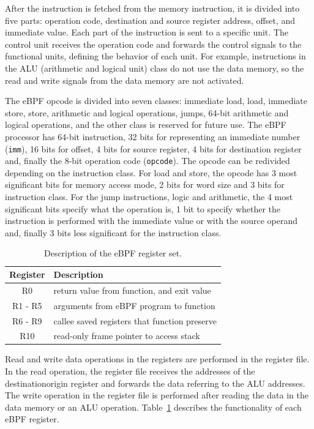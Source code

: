 After the instruction is fetched from the memory instruction, it is divided into five parts: operation code, destination and source register address, offset, and immediate value. Each part of the instruction is sent to a specific unit. The control unit receives the operation code and forwards the control signals to the functional units, defining the behavior of each unit. For example, instructions in the ALU (arithmetic and logical unit) class do not use the data memory, so the read and write signals from the data memory are not activated.

The eBPF opcode is divided into seven classes: immediate load, load, immediate store, store, arithmetic and logical operations, jumps, 64-bit arithmetic and logical operations, and the other class is reserved for future use. The eBPF processor has 64-bit instruction, 32 bits for representing an immediate number (\texttt{imm}), 16 bits for offset, 4 bits for source register, 4 bits for destination register and, finally the 8-bit operation code (\texttt{opcode}). The opcode can be redivided depending on the instruction class. For load and store, the opcode has 3 most significant bits for memory access mode, 2 bits for word size and 3 bits for instruction class. For the jump instructions, logic and arithmetic, the 4 most significant bits specify what the operation is, 1 bit to specify whether the instruction is performed with the immediate value or with the source operand and, finally 3 bits less significant for the instruction class.

\begin{table}[ht]
\centering
\caption{Description of the eBPF register set.}
\label{tab:eBPFreg}
\begin{tabular}{|c|l|}
\hline
\textbf{Register} & \textbf{Description} \\
\hline \hline
R0 & return value from function, and exit value\\
\hline
R1 - R5 & arguments from eBPF program to function\\
\hline
R6 - R9 & callee saved registers that function preserve\\
\hline
R10 & read-only frame pointer to access stack\\
\hline
\end{tabular}
\end{table}

Read and write data operations in the registers are performed in the register file. 
In the read operation, the register file receives the addresses of the destination\/origin register and forwards the data referring to the ALU addresses. The write operation in the register file is performed after reading the data in the data memory or an ALU operation.
Table~\ref{tab:eBPFreg} describes the functionality of each eBPF register.

